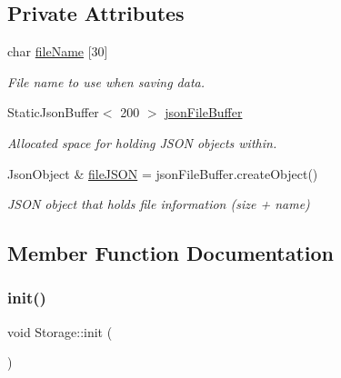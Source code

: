 \subsection*{Private Attributes}
\begin{DoxyCompactItemize}
\item 
\mbox{\label{class_storage_a7c3e886a0b8395c2045ab4f7e04481e1}} 
char \hyperlink{class_storage_a7c3e886a0b8395c2045ab4f7e04481e1}{file\+Name} \mbox{[}30\mbox{]}
\begin{DoxyCompactList}\small\item\em File name to use when saving data. \end{DoxyCompactList}\item 
\mbox{\label{class_storage_a14a7ad7e46c7cd5983344b81fed4265f}} 
Static\+Json\+Buffer$<$ 200 $>$ \hyperlink{class_storage_a14a7ad7e46c7cd5983344b81fed4265f}{json\+File\+Buffer}
\begin{DoxyCompactList}\small\item\em Allocated space for holding J\+S\+ON objects within. \end{DoxyCompactList}\item 
\mbox{\label{class_storage_ac503241aaa812f9b8ee36dd10cbd915a}} 
Json\+Object \& \hyperlink{class_storage_ac503241aaa812f9b8ee36dd10cbd915a}{file\+J\+S\+ON} = json\+File\+Buffer.\+create\+Object()
\begin{DoxyCompactList}\small\item\em J\+S\+ON object that holds file information (size + name) \end{DoxyCompactList}\end{DoxyCompactItemize}


\subsection{Member Function Documentation}
\mbox{\label{class_storage_a98b01eb20a64a4bf4127685147f7f6f1}} 
\subsubsection{\texorpdfstring{init()}{init()}}
{\footnotesize\ttfamily void Storage\+::init (\begin{DoxyParamCaption}{ }\end{DoxyParamCaption})}



